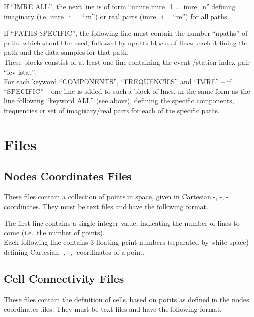 If ``IMRE ALL'', the next line is of form ``nimre imre\_1 ... imre\_n'' defining imaginary (i.e. imre\_i = ``im'') or real parts 
(imre\_i = ``re'') for all paths.

If ``PATHS SPECIFIC'', the following line must contain the number ``npaths'' of paths which should be used, followed by 
npahts blocks of lines, each defining the path and the data samples for that path. \\
These blocks constist of at least one line containing the event /station index pair ``iev istat''. \\
For each keyword ``COMPONENTS'', ``FREQUENCIES'' and ``IMRE'' -- if ``SPECIFIC'' -- one line is added to such a block 
of lines, in the same form as the line following ``keyword ALL'' (see above), 
defining the specific components, frequencies or set of imaginary/real parts for each of the specific paths.
%
\section{ Files} \label{files,sec:ecart_invgrid}
%
\subsection{Nodes Coordinates Files}
These files contain a collection of points in space, given in Cartesian -, -, 
-coordinates. They must be text files and have the following format.

The first line contains a single integer value, indicating the number of lines to come (i.e.\ the 
number of points).\\
Each following line contains 3 floating point numbers (separated by white space) defining Cartesian 
-, -, -coordinates of a point.

\subsection{Cell Connectivity Files}
These files contain the definition of cells, based on points as defined in the nodes coordinates files.
They must be text files and have the following format.

